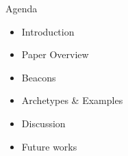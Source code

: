 \begin{frame}{Agenda}
    \begin{itemize}
        \item Introduction 
        \item Paper Overview
        \item Beacons
        \item Archetypes & Examples
        \item Discussion
        \item Future works
    \end{itemize}        
\end{frame}
